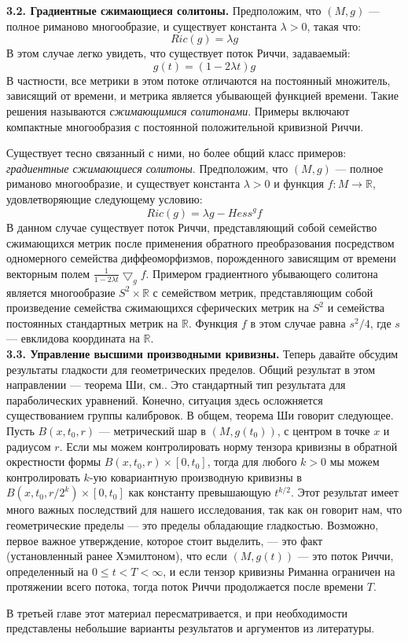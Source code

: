 \textbf{3.2. Градиентные сжимающиеся солитоны.} Предположим, что 
$(M,g)$ — полное риманово многообразие, и существует константа 
$\lambda >0$, такая что:
\[
    Ric(g)=\lambda g
\]
В этом случае легко увидеть, что существует поток Риччи, задаваемый:
\[
    g(t)=(1-2\lambda t)g
\]
В частности, все метрики в этом потоке отличаются на постоянный множитель, 
зависящий от времени, и метрика является убывающей функцией времени. 
Такие решения называются \textit{сжимающимися солитонами}. Примеры включают 
компактные многообразия с постоянной положительной кривизной Риччи.

Существует тесно связанный с ними, но более общий класс примеров: 
\textit{градиентные сжимающиеся солитоны}. Предположим, что 
$(M,g)$ — полное риманово многообразие, и существует константа 
$\lambda >0$ и функция $f:M \rightarrow \mathbb{R}$, удовлетворяющие следующему условию:
\[
    Ric(g)=\lambda g - {Hess}^g f
\]
В данном случае существует поток Риччи, представляющий собой 
семейство сжимающихся метрик после применения обратного 
преобразования посредством одномерного семейства диффеоморфизмов, 
порожденного зависящим от времени векторным полем 
$\frac{1}{1-2\lambda t}{\bigtriangledown}_g f$. 
Примером градиентного убывающего солитона является многообразие 
$S^2 \times \mathbb{R}$ с семейством метрик, представляющим 
собой произведение семейства сжимающихся сферических метрик на 
$S^2$ и семейства постоянных стандартных метрик на $\mathbb{R}$. 
Функция $f$ в этом случае равна $s^2/4$, 
где $s$ — евклидова координата на $\mathbb{R}$.\\

\textbf{3.3. Управление высшими производными кривизны.} Теперь 
давайте обсудим результаты гладкости для геометрических пределов. 
Общий результат в этом направлении — теорема Ши, см.\cite{c65, c66}. 
Это стандартный тип результата для параболических уравнений. 
Конечно, ситуация здесь осложняется существованием группы калибровок. 
В общем, теорема Ши говорит следующее. Пусть  
$B(x,t_0,r)$ — метрический шар в $(M,g(t_0))$, с центром в точке  
$x$ и радиусом $r$. Если мы можем контролировать норму тензора 
кривизны в обратной окрестности формы $B(x,t_0,r)\times [0,t_0]$, 
тогда для любого $k>0$ мы можем контролировать $k$-ую 
ковариантную производную кривизны в 
$B(x,t_0,r/2^k)\times [0,t_0]$ как константу превышающую 
$t^{k/2}$. Этот результат имеет много важных последствий для 
нашего исследования, так как он говорит нам, что геометрические 
пределы — это пределы обладающие гладкостью. 
Возможно, первое важное утверждение, которое 
стоит выделить, — это факт (установленный ранее Хэмилтоном), 
что если $(M,g(t))$ — это поток Риччи, 
определенный на $0 \leq t< T< \infty$, и если тензор кривизны Риманна 
ограничен на протяжении всего потока, тогда поток Риччи 
продолжается после времени $T$. 

В третьей главе этот материал пересматривается, и при 
необходимости представлены небольшие варианты результатов и 
аргументов из литературы.\\

